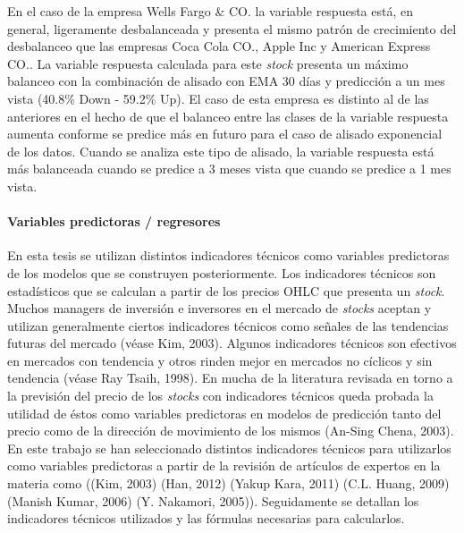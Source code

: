 \documentclass[]{DissertateUSU}
\let\oldparagraph\paragraph
\renewcommand{\paragraph}[1]{\oldparagraph{#1}\mbox{}}
\begin{document}
\setlength\parskip{5ex}

\noindent En el caso de la empresa Wells Fargo \& CO. la variable
respuesta está, en general, ligeramente desbalanceada y presenta el
mismo patrón de crecimiento del desbalanceo que las empresas Coca Cola
CO., Apple Inc y American Express CO.. La variable respuesta calculada
para este \emph{stock} presenta un máximo balanceo con la combinación de
alisado con EMA 30 días y predicción a un mes vista (40.8\% Down -
59.2\% Up). El caso de esta empresa es distinto al de las anteriores en
el hecho de que el balanceo entre las clases de la variable respuesta
aumenta conforme se predice más en futuro para el caso de alisado
exponencial de los datos. Cuando se analiza este tipo de alisado, la
variable respuesta está más balanceada cuando se predice a 3 meses vista
que cuando se predice a 1 mes vista.

\setlength\parskip{5ex}
\justifying

\hypertarget{variables-predictoras-regresores}{%
\paragraph{Variables predictoras /
regresores}\label{variables-predictoras-regresores}}

\noindent En esta tesis se utilizan distintos indicadores técnicos como
variables predictoras de los modelos que se construyen posteriormente.
Los indicadores técnicos son estadísticos que se calculan a partir de
los precios OHLC que presenta un \emph{stock}. Muchos managers de
inversión e inversores en el mercado de \emph{stocks} aceptan y utilizan
generalmente ciertos indicadores técnicos como señales de las tendencias
futuras del mercado (véase Kim, 2003). Algunos indicadores técnicos son
efectivos en mercados con tendencia y otros rinden mejor en mercados no
cíclicos y sin tendencia (véase Ray Tsaih, 1998). En mucha de la
literatura revisada en torno a la previsión del precio de los
\emph{stocks} con indicadores técnicos queda probada la utilidad de
éstos como variables predictoras en modelos de predicción tanto del
precio como de la dirección de movimiento de los mismos (An-Sing Chena,
2003). En este trabajo se han seleccionado distintos indicadores
técnicos para utilizarlos como variables predictoras a partir de la
revisión de artículos de expertos en la materia como ((Kim, 2003) (Han,
2012) (Yakup Kara, 2011) (C.L. Huang, 2009) (Manish Kumar, 2006) (Y.
Nakamori, 2005)). Seguidamente se detallan los indicadores técnicos
utilizados y las fórmulas necesarias para calcularlos.
\end{document}
